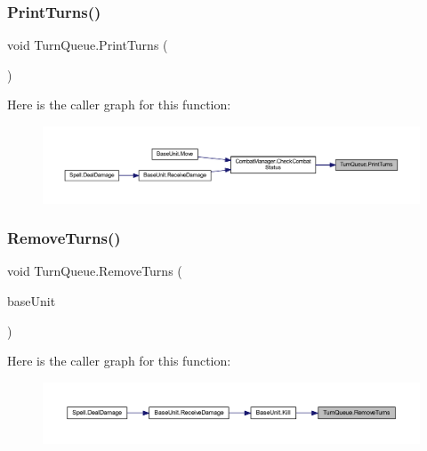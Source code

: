 \subsubsection{\texorpdfstring{PrintTurns()}{PrintTurns()}}
{\footnotesize\ttfamily void Turn\+Queue.\+Print\+Turns (\begin{DoxyParamCaption}{ }\end{DoxyParamCaption})}

Here is the caller graph for this function\+:\nopagebreak
\begin{figure}[H]
\begin{center}
\leavevmode
\includegraphics[width=350pt]{class_turn_queue_ae1c735b715ec963c76f0291cb9629338_icgraph}
\end{center}
\end{figure}
\mbox{\label{class_turn_queue_af6ee9af337f42a417812f4bc96f8d600}} 
\subsubsection{\texorpdfstring{RemoveTurns()}{RemoveTurns()}}
{\footnotesize\ttfamily void Turn\+Queue.\+Remove\+Turns (\begin{DoxyParamCaption}\item[{\mbox{\hyperlink{class_base_unit}{Base\+Unit}}}]{base\+Unit }\end{DoxyParamCaption})}

Here is the caller graph for this function\+:\nopagebreak
\begin{figure}[H]
\begin{center}
\leavevmode
\includegraphics[width=350pt]{class_turn_queue_af6ee9af337f42a417812f4bc96f8d600_icgraph}
\end{center}
\end{figure}
\mbox{\label{class_turn_queue_afadc89a92617f7b2ee4e93025d2f2217}} 
